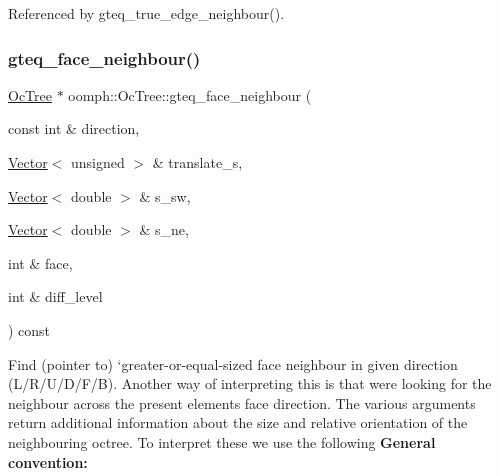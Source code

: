 Referenced by gteq\+\_\+true\+\_\+edge\+\_\+neighbour().

\mbox{\label{classoomph_1_1OcTree_a80a25fc3fbfa7bbfdea7b02ab98e13fb}} 
\subsubsection{\texorpdfstring{gteq\+\_\+face\+\_\+neighbour()}{gteq\_face\_neighbour()}\hspace{0.1cm}{\footnotesize\ttfamily [1/2]}}
{\footnotesize\ttfamily \hyperlink{classoomph_1_1OcTree}{Oc\+Tree} $\ast$ oomph\+::\+Oc\+Tree\+::gteq\+\_\+face\+\_\+neighbour (\begin{DoxyParamCaption}\item[{const int \&}]{direction,  }\item[{\hyperlink{classoomph_1_1Vector}{Vector}$<$ unsigned $>$ \&}]{translate\+\_\+s,  }\item[{\hyperlink{classoomph_1_1Vector}{Vector}$<$ double $>$ \&}]{s\+\_\+sw,  }\item[{\hyperlink{classoomph_1_1Vector}{Vector}$<$ double $>$ \&}]{s\+\_\+ne,  }\item[{int \&}]{face,  }\item[{int \&}]{diff\+\_\+level }\end{DoxyParamCaption}) const}



Find (pointer to) `greater-\/or-\/equal-\/sized face neighbour\textquotesingle{} in given direction (L/\+R/\+U/\+D/\+F/B). Another way of interpreting this is that we\textquotesingle{}re looking for the neighbour across the present element\textquotesingle{}s face \textquotesingle{}direction\textquotesingle{}. The various arguments return additional information about the size and relative orientation of the neighbouring octree. To interpret these we use the following {\bfseries General convention\+:} 


